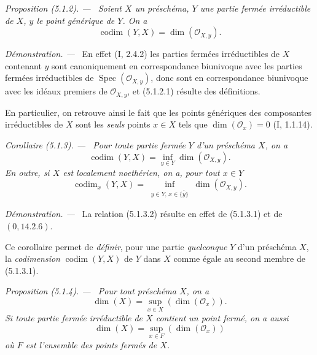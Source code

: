 \documentclass[10pt,oneside]{book}
\newcommand{\oldpage}[2][]{%
  \setcounter{footnote}{0}%
  \marginpar{\scriptsize\textbf{#1}~|~#2}\ignorespaces}
\newenvironment{proposition}[1][]{%
  \par\medskip\noindent\itshape Proposition (#1). ---\ }{\par}
\newenvironment{corollary}[1][]{%
  \par\medskip\noindent\itshape Corollaire (#1). ---\ }{\par}
\newenvironment{proof}{%
  \par\medskip\noindent\textit{Démonstration. ---\ }}{\par}
\begin{document}
\begin{proposition}[5.1.2]
\label{IV.2.5.1.2-fr}
Soient $X$ un préschéma, $Y$ une partie fermée irréductible de $X$, $y$ le
point générique de $Y$. On a
\begin{equation}
\operatorname{codim}(Y,X)=\dim(\mathcal O_{X,y}).
\tag{5.1.2.1}\label{IV.2.5.1.2.1-fr}
\end{equation}
\end{proposition}

\begin{proof}
En effet (I, 2.4.2) les parties fermées irréductibles de $X$ contenant $y$
sont canoniquement en correspondance biunivoque avec les parties fermées
irréductibles de $\operatorname{Spec}(\mathcal O_{X,y})$, donc sont en
correspondance biunivoque avec les idéaux premiers de $\mathcal O_{X,y}$, et
(5.1.2.1) résulte des définitions.

En particulier, on retrouve ainsi le fait que les points génériques des
composantes irréductibles de $X$ sont les \emph{seuls} points $x\in X$ tels
que $\dim(\mathcal O_x)=0$ (I, 1.1.14).
\end{proof}

\oldpage[IV-2]{87}

\begin{corollary}[5.1.3]
\label{IV.2.5.1.3-fr}
Pour toute partie fermée $Y$ d'un préschéma $X$, on a
\begin{equation}
\operatorname{codim}(Y,X)=\inf_{y\in Y}\dim(\mathcal O_{X,y}).
\tag{5.1.3.1}\label{IV.2.5.1.3.1-fr}
\end{equation}
En outre, si $X$ est localement noethérien, on a, pour tout $x\in Y$
\begin{equation}
\operatorname{codim}_x(Y,X)=
\inf_{\substack{y\in Y,\,x\in\overline{\{y\}}}}
\dim(\mathcal O_{X,y}).
\tag{5.1.3.2}\label{IV.2.5.1.3.2-fr}
\end{equation}
\end{corollary}

\begin{proof}
La relation (5.1.3.2) résulte en effet de (5.1.3.1) et de $(0,14.2.6)$.

Ce corollaire permet de \emph{définir}, pour une partie \emph{quelconque}
$Y$ d'un préschéma $X$, la \emph{codimension} $\operatorname{codim}(Y,X)$ de
$Y$ dans $X$ comme égale au second membre de (5.1.3.1).
\end{proof}

\begin{proposition}[5.1.4]
\label{IV.2.5.1.4-fr}
Pour tout préschéma $X$, on a
\begin{equation}
\dim(X)=\sup_{x\in X}(\dim(\mathcal O_x)).
\tag{5.1.4.1}\label{IV.2.5.1.4.1-fr}
\end{equation}
Si toute partie fermée irréductible de $X$ contient un point fermé, on a aussi
\begin{equation}
\dim(X)=\sup_{x\in F}(\dim(\mathcal O_x))
\tag{5.1.4.2}\label{IV.2.5.1.4.2-fr}
\end{equation}
où $F$ est l'ensemble des points fermés de $X$.
\end{proposition}
\end{document}
